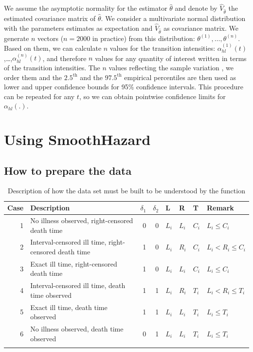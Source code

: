 \documentclass[article]{jss}
\begin{document}
We assume the asymptotic normality for the estimator \(\hat{\theta}\)
and denote by \(\hat{V}_{\hat{\theta}}\) the estimated covariance matrix
of \(\hat{\theta}\). We consider a multivariate normal distribution with
the parameters estimates as expectation and \(\hat{V}_{\hat{\theta}}\)
as covariance matrix. We generate \(n\) vectors (\(n=2000\) in practice)
from this distribution: \(\theta^{(1)},\ldots,\theta^{(n)}\).  Based on
them, we can calculate \(n\) values for the transition intensities:
\(\alpha_{hl}^{(1)}(t)\),\ldots,\(\alpha_{hl}^{(n)}(t)\), and therefore
\(n\) values for any quantity of interest written in terms of the
transition intensities.  The \(n\) values reflecting the sample
variation \citep{Aalen_Farewell_De_Angelis_Day_Gill_1997}, we order
them and the \(2.5^{\text{th}}\) and the \(97.5^{\text{th}}\) empirical
percentiles are then used as lower and upper confidence bounds for
95\% confidence intervals.  This procedure can be repeated for any
\(t\), so we can obtain pointwise confidence limits for
\({\alpha}_{hl}(.)\).

\section{Using SmoothHazard}
\label{sec-5}

\subsection{How to prepare the data}
\label{sec-5-1}
\begin{table}
\centering
\begin{tabular}{rm{18em}rrllll}
Case & Description & $\delta_1$ & $\delta_2$ & L & R & T & Remark\\
\hline
1 & No illness observed, right-censored death time & 0 & 0 & $L_i$ & $L_i$ & $C_i$ & $L_i\le C_i$\\
2 & Interval-censored ill time, right-censored death time & 1 & 0 & $L_i$ & $R_i$ & $C_i$ & $L_i<R_i\le C_i$\\
3 & Exact ill time, right-censored death time & 1 & 0 & $L_i$ & $L_i$ & $C_i$ & $L_i\le C_i$\\
4 & Interval-censored ill time, death time observed & 1 & 1 & $L_i$ & $R_i$ & $T_i$ & $L_i<R_i\le T_i$\\
5 & Exact ill time, death time observed & 1 & 1 & $L_i$ & $L_i$ & $T_i$ & $L_i\le T_i$\\
6 & No illness observed, death time observed & 0 & 1 & $L_i$ & $L_i$ & $T_i$ & $L_i\le T_i$\\
 &  &  &  &  &  &  & \\
\end{tabular}
\caption{Description of how the data set must be built to be understood by the  function}
\label{tab:XX}
\end{table}
\end{document}
